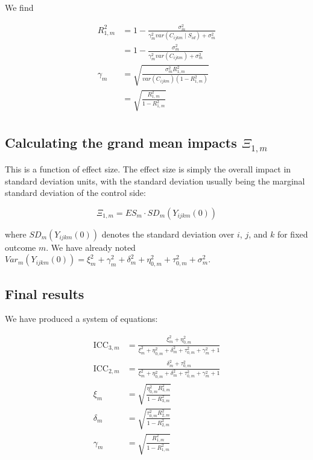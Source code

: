 \documentclass[12pt]{article}
\begin{document}
We find

\begin{align*}
R^2_{1,m} &= 1 - \frac{ \sigma^2_m }{ \gamma_m^2 var( C_{ijkm} \mid S_{id} ) + \sigma^2_m }\\
&= 1 - \frac{ \sigma^2_m }{ \gamma_m^2 var( C_{ijkm}) + \sigma^2_m }\\
\gamma_m &= \sqrt{\frac{\sigma^2_m R_{1,m}^2}{var( C_{ijkm})(1 - R_{1,m}^2)}}\\
&= \sqrt{\frac{R_{1,m}^2}{1 - R_{1,m}^2}}\\
\end{align*}


\subsection{Calculating the grand mean impacts $\Xi_{1,m}$}

This is a function of effect size.  The effect size is simply the overall impact in standard deviation units, with the standard deviation usually being the marginal standard deviation of the control side:

\[ \Xi_{1,m} = ES_m \cdot SD_m( Y_{ijkm}(0) ) \]

where $SD_m(Y_{ijkm}(0))$ denotes the standard deviation over $i$, $j$, and $k$ for fixed outcome $m$.
We have already noted $Var_m( Y_{ijkm}(0) ) = \xi_m^2 + \gamma_m^2  + \delta_m^2  +  \eta^2_{0,m} + \tau^2_{0,m} + \sigma^2_m$.


\subsection{Final results}

We have produced a system of equations:

\begin{align*}
\text{ICC}_{3,m} &= \frac{\xi^2_m + \eta_{0,m}^2}{\xi_m^2 +  \eta^2_{0,m} + \delta_m^2  + \tau^2_{0,m} + \gamma_m^2 + 1}\\
\text{ICC}_{2,m} &= \frac{\delta_m^2  + \tau_{0,m}^2}{\xi_m^2 +  \eta^2_{0,m} + \delta_m^2  + \tau^2_{0,m} + \gamma_m^2 + 1}\\
\xi_m  &= \sqrt{\frac{\eta^2_{0,m}R_{3,m}^2}{1 - R_{3,m}^2}}\\
\delta_m &= \sqrt{\frac{\tau^2_{0,m}R_{2,m}^2}{1 - R_{2,m}^2}}\\
\gamma_m &= \sqrt{\frac{R_{1,m}^2}{1 - R_{1,m}^2}}
\end{align*}
\end{document}
